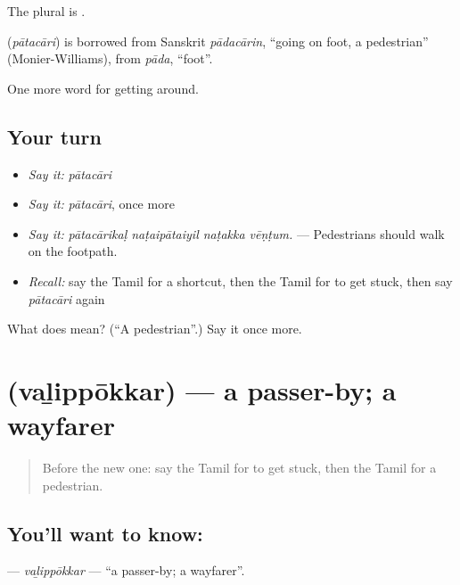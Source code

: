 The plural is .

\begin{cousinweb}
\textbf{} (\emph{pātacāri}) is borrowed from Sanskrit \emph{pādacārin}, \textquotedblleft{}going on foot, a pedestrian\textquotedblright{} (Monier-Williams), from \emph{pāda}, \textquotedblleft{}foot\textquotedblright{}.
\end{cousinweb}

\begin{grammarlens}[title={What you've built}]
One more word for getting around.
\end{grammarlens}

\subsection*{Your turn}
\begin{itemize}
\raggedright
  \item \emph{Say it:} \emph{pātacāri}
  \item \emph{Say it:} \emph{pātacāri}, once more
  \item \emph{Say it:} \emph{pātacārikaḷ naṭaipātaiyil naṭakka vēṇṭum.} — Pedestrians should walk on the footpath.
  \item \emph{Recall:} say the Tamil for a shortcut, then the Tamil for to get stuck, then say \emph{pātacāri} again
\end{itemize}

\begin{tcolorbox}[breakable,colback=teal!4,colframe=teal!35!black,title={Before you move on}]
What does  mean? (\textquotedblleft{}A pedestrian\textquotedblright{}.) Say it once more.
\end{tcolorbox}
\section[\texorpdfstring{\ta{வழிப்போக்கர்} (vaḻippōkkar)}{வழிப்போக்கர் (vaḻippōkkar)}]{ (vaḻippōkkar) — a passer-by; a wayfarer}

\label{lesson:TA-C410-valippokkar}



\begin{quote}
Before the new one: say the Tamil for to get stuck, then the Tamil for a pedestrian.
\end{quote}

\subsection*{You'll want to know: }
\textbf{} — \emph{vaḻippōkkar} — \textquotedblleft{}a passer-by; a wayfarer\textquotedblright{}.


